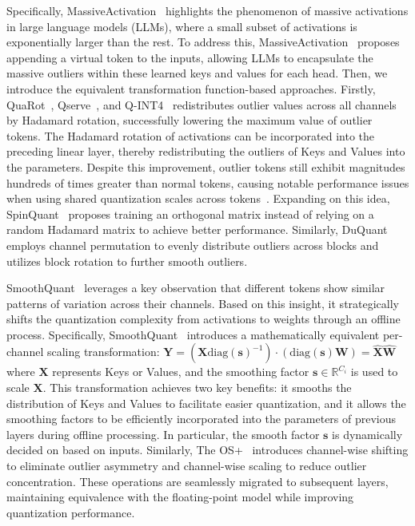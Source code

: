 Specifically, MassiveActivation~\cite{DBLP:journals/corr/abs-2402-17762} highlights the phenomenon of massive activations in large language models (LLMs), where a small subset of activations is exponentially larger than the rest. To address this, MassiveActivation~\cite{DBLP:journals/corr/abs-2402-17762} proposes appending a virtual token to the inputs, allowing LLMs to encapsulate the massive outliers within these learned keys and values for each head.
Then, we introduce the  equivalent transformation function-based approaches. Firstly,
QuaRot~\cite{ashkboos2024quarot}, Qserve~\cite{DBLP:journals/corr/abs-2405-04532}, and Q-INT4~\cite{DBLP:conf/nips/XiLCZ23} redistributes outlier values across all channels by Hadamard rotation, successfully lowering the maximum value of outlier tokens. 
The Hadamard rotation of activations can be incorporated into the preceding linear layer, thereby redistributing the outliers of Keys and Values into the parameters.
Despite this improvement, outlier tokens still exhibit magnitudes hundreds of times greater than normal tokens, causing notable performance issues when using shared quantization scales across tokens~\cite{chen2024prefixquant}.
Expanding on this idea, SpinQuant~\cite{liu2024spinquant} proposes training an orthogonal matrix instead of relying on a random Hadamard matrix to achieve better performance. Similarly, DuQuant~\cite{lin2024duquant} employs channel permutation to evenly distribute outliers across blocks and utilizes block rotation to further smooth outliers.  



SmoothQuant~\cite{DBLP:conf/icml/XiaoLSWDH23} leverages a key observation that different tokens show similar patterns of variation across their channels. Based on this insight, it strategically shifts the quantization complexity from activations to weights through an offline process.
Specifically, SmoothQuant~\cite{DBLP:conf/icml/XiaoLSWDH23} introduces a mathematically equivalent per-channel scaling transformation:
$\mathbf{Y} = (\mathbf{X}\text{diag}(\mathbf{s})^{-1}) \cdot (\text{diag}(\mathbf{s})\mathbf{W}) = \mathbf{\hat{X}}\mathbf{\hat{W}}$
where $\mathbf{X}$ represents Keys or Values, and the smoothing factor $\mathbf{s}\in \mathbb{R}^{C_i}$ is used to scale $\mathbf{X}$. This transformation achieves two key benefits: it smooths the distribution of Keys and Values to facilitate easier quantization, and it allows the smoothing factors to be efficiently incorporated into the parameters of previous layers during offline processing.
In particular, the smooth factor $\mathbf{s}$ is dynamically decided on based on inputs.
Similarly,
The OS+~\cite{wei2023outlier} introduces channel-wise shifting to eliminate outlier asymmetry and channel-wise scaling to reduce outlier concentration. These operations are seamlessly migrated to subsequent layers, maintaining equivalence with the floating-point model while improving quantization performance.



